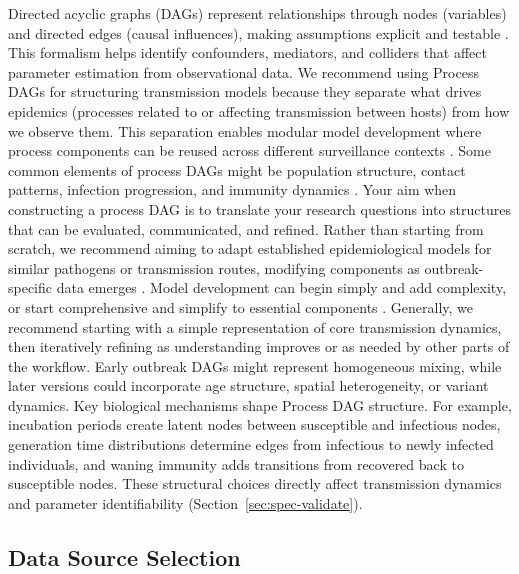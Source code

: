 \documentclass{article}
\begin{document}
Directed acyclic graphs (DAGs) represent relationships through nodes  (variables) and directed edges (causal influences), making assumptions explicit and testable \citep{digitale2022tutorial}. 
This formalism helps identify confounders, mediators, and colliders that affect parameter estimation from observational data.
We recommend using Process DAGs for structuring transmission models because they separate what drives epidemics (processes related to or affecting transmission between hosts) from how we observe them.  
This separation enables modular model development where process components can be reused across different surveillance contexts \citep{nicholson2022interoperability}.
Some common elements of process DAGs might be population structure, contact patterns, infection progression, and immunity dynamics \citep{deangelis2018analysing}. 
Your aim when constructing a process DAG  is to translate your research questions into structures that can be evaluated, communicated, and refined.
Rather than starting from scratch, we recommend aiming to adapt established epidemiological models for similar pathogens or transmission routes, modifying components as outbreak-specific data emerges \citep{gelman2020bayesian}.
Model development can begin simply and add complexity, or start comprehensive and simplify to essential components \citep{gelman2020bayesian}.
Generally, we recommend starting with a simple representation of core transmission dynamics, then iteratively refining as understanding improves or as needed by other parts of the workflow.
Early outbreak DAGs might represent homogeneous mixing, while later versions could incorporate age structure, spatial heterogeneity, or variant dynamics.
 Key biological mechanisms shape Process DAG structure. 
 For example, incubation periods create latent nodes between susceptible and infectious nodes, generation time distributions determine edges from infectious to newly infected individuals, and waning immunity adds transitions from recovered back to susceptible nodes.
 These structural choices directly affect transmission dynamics and parameter identifiability (Section~\ref{sec:spec-validate}). 

\subsection{Data Source Selection}
\end{document}
